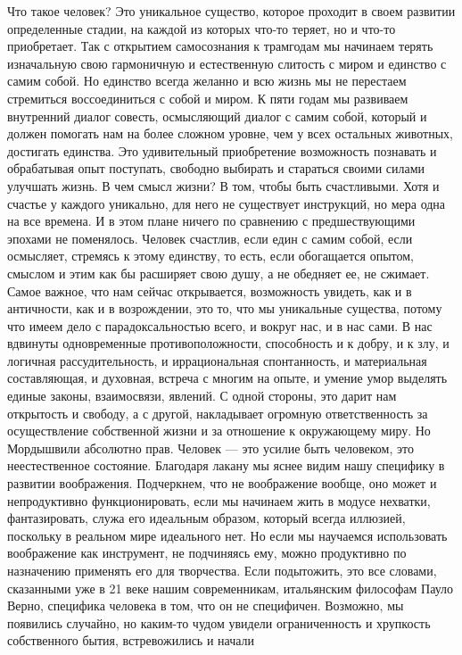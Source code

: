Что такое человек? Это уникальное существо, которое проходит
в своем развитии определенные стадии, на каждой из которых что-то теряет, но и
что-то приобретает. Так с открытием самосознания к трамгодам мы начинаем терять
изначальную свою гармоничную и естественную слитость с миром и единство с самим
собой. Но единство всегда желанно и всю жизнь мы не перестаем стремиться
воссоединиться с собой и миром. К пяти годам мы развиваем внутренний диалог
совесть, осмысляющий диалог с самим собой, который и должен помогать нам на
более сложном уровне, чем у всех остальных животных, достигать единства. Это
удивительный приобретение возможность познавать и обрабатывая опыт поступать,
свободно выбирать и стараться своими силами улучшать жизнь. В чем смысл жизни? В
том, чтобы быть счастливыми. Хотя и счастье у каждого уникально, для него не
существует инструкций, но мера одна на все времена. И в этом плане ничего по
сравнению с предшествующими эпохами не поменялось. Человек счастлив, если един с
самим собой, если осмысляет, стремясь к этому единству, то есть, если
обогащается опытом, смыслом и этим как бы расширяет свою душу, а не обедняет ее,
не сжимает. Самое важное, что нам сейчас открывается, возможность увидеть, как и
в античности, как и в возрождении, это то, что мы уникальные существа, потому
что имеем дело с парадоксальностью всего, и вокруг нас, и в нас сами. В нас
вдвинуты одновременные противоположности, способность и к добру, и к злу, и
логичная рассудительность, и иррациональная спонтанность, и материальная
составляющая, и духовная, встреча с многим на опыте, и умение умор выделять
единые законы, взаимосвязи, явлений. С одной стороны, это дарит нам открытость и
свободу, а с другой, накладывает огромную ответственность за осуществление
собственной жизни и за отношение к окружающему миру. Но Мордышвили абсолютно
прав. Человек — это усилие быть человеком, это неестественное состояние.
Благодаря лакану мы яснее видим нашу специфику в развитии воображения.
Подчеркнем, что не воображение вообще, оно может и непродуктивно
функционировать, если мы начинаем жить в модусе нехватки, фантазировать, служа
его идеальным образом, который всегда иллюзией, поскольку в реальном мире
идеального нет. Но если мы научаемся использовать воображение как инструмент, не
подчиняясь ему, можно продуктивно по назначению применять его для творчества.
Если подытожить, это все словами, сказанными уже в 21 веке нашим современникам,
итальянским философам Пауло Верно, специфика человека в том, что он не
специфичен. Возможно, мы появились случайно, но каким-то чудом увидели
ограниченность и хрупкость собственного бытия, встревожились и начали
